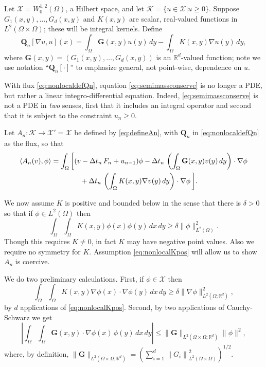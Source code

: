 \documentclass[final,leqno,onefignum,onetabnum]{siamltex1213bueler}
\newcommand\bG{\mathbf{G}}
\newcommand\bQ{\mathbf{Q}}
\renewcommand{\grad}{\nabla}
\newcommand{\ip}[2]{\ensuremath{\left<#1,#2\right>}}
\newcommand\RR{\mathbb{R}}
\begin{document}
Let $\mathcal{X} = W_0^{1,2}(\Omega)$, a Hilbert space, and let $\mathcal{K}=\{u\in\mathcal{X}|u\ge 0\}$.  Suppose $G_1(x,y), \dots, G_d(x,y)$ and $K(x,y)$ are scalar, real-valued functions in $L^2(\Omega\times \Omega)$; these will be integral kernels.  Define
\begin{equation}
\bQ_n[\grad u,u](x) = \int_\Omega \bG(x,y) u(y)\,dy - \int_\Omega K(x,y) \grad u(y)\,dy, \label{eq:nonlocaldefQn}
\end{equation}
where $\bG(x,y) = (G_1(x,y), \dots, G_d(x,y))$ is an $\RR^d$-valued function; note we use notation ``$\bQ_n[\cdot]$'' to emphasize general, not point-wise, dependence on $u$.

With flux \eqref{eq:nonlocaldefQn}, equation \eqref{eq:semimassconserve} is no longer a PDE, but rather a linear integro-differential equation.  Indeed, \eqref{eq:semimassconserve} is not a PDE in \emph{two} senses, first that it includes an integral operator and second that it is subject to the constraint $u_n\ge 0$.

Let $A_n:\mathcal{K} \to \mathcal{X}'=\mathcal{X}$ be defined by \eqref{eq:defineAn}, with $\bQ_n$ in \eqref{eq:nonlocaldefQn} as the flux, so that
\begin{align}
    \ip{A_n(v)}{\phi} &= \int_\Omega \bigg[(v - \Delta t_n\,F_n + u_{n-1})\phi - \Delta t_n\,\left(\int_\Omega \bG(x,y) v(y)\,dy\right)\cdot \grad \phi \label{eq:nonlocaldefnAn} \\
                      &\qquad\qquad + \Delta t_n\,\left(\int_\Omega K(x,y) \grad v(y)\,dy\right)\cdot \grad \phi\,\bigg]. \notag
\end{align}

We now assume $K$ is positive and bounded below \cite{PorterStirling1990} in the sense that there is $\delta>0$ so that if $\phi \in L^2(\Omega)$ then
\begin{equation}
   \int_\Omega \int_\Omega K(x,y) \phi(x) \phi(y)\,dx\,dy \ge \delta \|\phi\|_{L^2(\Omega)}^2.  \label{eq:nonlocalKpos}
\end{equation}
Though this requires $K\ne 0$, in fact $K$ may have negative point values.  Also we require no symmetry for $K$.  Assumption \eqref{eq:nonlocalKpos} will allow us to show $A_n$ is coercive.

We do two preliminary calculations.  First, if $\phi\in\mathcal{X}$ then
\begin{equation}
  \int_\Omega \int_\Omega K(x,y) \grad \phi(x) \cdot \grad \phi(y)\,dx\,dy \ge \delta \|\grad\phi\|_{L^2(\Omega;\RR^d)}^2,  \label{eq:nonlocalKposRd}
\end{equation}
by $d$ applications of \eqref{eq:nonlocalKpos}.  Second, by two applications of Cauchy-Schwarz we get
\begin{equation}
\left|\int_\Omega \int_\Omega \bG(x,y) \cdot \grad \phi(x)\,\phi(y) \,dx\,dy\right|
  \le \|\bG\|_{L^2(\Omega\times\Omega;\RR^d)} \|\phi\|^2,   \label{eq:nonlocalGbound}
\end{equation}
where, by definition, $\|\bG\|_{L^2(\Omega\times\Omega;\RR^d)} = \left(\sum_{i=1}^d \left\|G_i\right\|_{L^2(\Omega \times \Omega)}^2\right)^{1/2}$.
\end{document}
